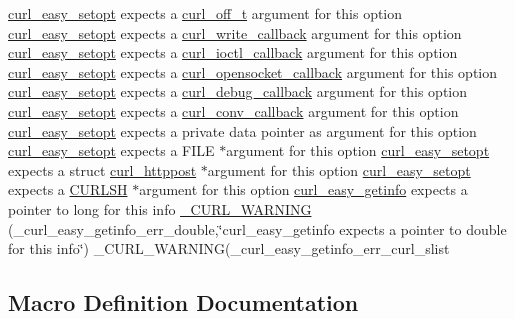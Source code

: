 \begin{DoxyCompactItemize}
\hyperlink{easy_8h_a7b171739b7bb728b3b58b2e6ec454aa0}{curl\+\_\+easy\+\_\+setopt} expects a \hyperlink{curlbuild_8h_a494e2b4279dc064f7ed1d0abd602b28d}{curl\+\_\+off\+\_\+t} argument for this option \hyperlink{easy_8h_a7b171739b7bb728b3b58b2e6ec454aa0}{curl\+\_\+easy\+\_\+setopt} expects a \hyperlink{curl_8h_ad65e62dcde45b356254b0f25f38dd802}{curl\+\_\+write\+\_\+callback} argument for this option \hyperlink{easy_8h_a7b171739b7bb728b3b58b2e6ec454aa0}{curl\+\_\+easy\+\_\+setopt} expects a \hyperlink{curl_8h_ae0524f6ec082005e39eb275c71c59a3b}{curl\+\_\+ioctl\+\_\+callback} argument for this option \hyperlink{easy_8h_a7b171739b7bb728b3b58b2e6ec454aa0}{curl\+\_\+easy\+\_\+setopt} expects a \hyperlink{curl_8h_a1b8b8f3e1a4e538a6bb1dd83a3388547}{curl\+\_\+opensocket\+\_\+callback} argument for this option \hyperlink{easy_8h_a7b171739b7bb728b3b58b2e6ec454aa0}{curl\+\_\+easy\+\_\+setopt} expects a \hyperlink{curl_8h_a50147c55283ee1fa3322b0d5aff2326c}{curl\+\_\+debug\+\_\+callback} argument for this option \hyperlink{easy_8h_a7b171739b7bb728b3b58b2e6ec454aa0}{curl\+\_\+easy\+\_\+setopt} expects a \hyperlink{curl_8h_acb230bf6dbf7bcb6e4e8740ea42ca3b3}{curl\+\_\+conv\+\_\+callback} argument for this option \hyperlink{easy_8h_a7b171739b7bb728b3b58b2e6ec454aa0}{curl\+\_\+easy\+\_\+setopt} expects a private data pointer as argument for this option \hyperlink{easy_8h_a7b171739b7bb728b3b58b2e6ec454aa0}{curl\+\_\+easy\+\_\+setopt} expects a F\+I\+LE $\ast$argument for this option \hyperlink{easy_8h_a7b171739b7bb728b3b58b2e6ec454aa0}{curl\+\_\+easy\+\_\+setopt} expects a struct \hyperlink{structcurl__httppost}{curl\+\_\+httppost} $\ast$argument for this option \hyperlink{easy_8h_a7b171739b7bb728b3b58b2e6ec454aa0}{curl\+\_\+easy\+\_\+setopt} expects a \hyperlink{curl_8h_a746d4e7ba89fe28a008e91cffb343ef0}{C\+U\+R\+L\+SH} $\ast$argument for this option \hyperlink{easy_8h_ae395d1ab3a14e03800b6aa89744aec4c}{curl\+\_\+easy\+\_\+getinfo} expects a pointer to long for this info \hyperlink{typecheck-gcc_8h_af0e68b2e6d33faf4c40e004cda04ca30}{\+\_\+\+C\+U\+R\+L\+\_\+\+W\+A\+R\+N\+I\+NG} (\+\_\+curl\+\_\+easy\+\_\+getinfo\+\_\+err\+\_\+double,\char`\"{}curl\+\_\+easy\+\_\+getinfo expects a pointer to double for this info\char`\"{}) \+\_\+\+C\+U\+R\+L\+\_\+\+W\+A\+R\+N\+I\+NG(\+\_\+curl\+\_\+easy\+\_\+getinfo\+\_\+err\+\_\+curl\+\_\+slist
\end{DoxyCompactItemize}


\subsection{Macro Definition Documentation}
